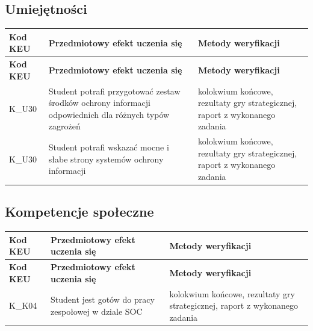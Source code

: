 \documentclass[12pt, a4paper]{article}
\newcommand{\thdrule}{\noalign{\global\setlength{\extrarowheight}{0pt}}}
\newcommand{\thdend}{\noalign{\global\setlength{\extrarowheight}{3pt}}}
\begin{document}
\subsection*{Umiejętności}
{\scriptsize
\begin{longtable}{m{1.6cm}m{9.0cm}m{4.2cm}}
\thdrule\toprule
\rowcolor{pjatkRed} {\color{white}\footnotesize\textbf{\vphantom{Ag}Kod KEU}} & {\color{white}\footnotesize\textbf{\vphantom{Ag}Przedmiotowy efekt uczenia się}} & {\color{white}\footnotesize\textbf{\vphantom{Ag}Metody weryfikacji}} \\
\midrule\thdend
\endfirsthead
\thdrule\toprule
\rowcolor{pjatkRed} {\color{white}\footnotesize\textbf{\vphantom{Ag}Kod KEU}} & {\color{white}\footnotesize\textbf{\vphantom{Ag}Przedmiotowy efekt uczenia się}} & {\color{white}\footnotesize\textbf{\vphantom{Ag}Metody weryfikacji}} \\
\midrule\thdend
\endhead
  \rowcolor{tableRowLight} K\_U30 & Student potrafi przygotować zestaw środków ochrony informacji odpowiednich dla różnych typów zagrożeń & kolokwium końcowe, rezultaty gry strategicznej, raport z wykonanego zadania \\
  \rowcolor{tableRowAlt} K\_U30 & Student potrafi wskazać mocne i słabe strony systemów ochrony informacji & kolokwium końcowe, rezultaty gry strategicznej, raport z wykonanego zadania \\
\bottomrule
\end{longtable}}

\subsection*{Kompetencje społeczne}
{\scriptsize
\begin{longtable}{m{1.6cm}m{9.0cm}m{4.2cm}}
\thdrule\toprule
\rowcolor{pjatkRed} {\color{white}\footnotesize\textbf{\vphantom{Ag}Kod KEU}} & {\color{white}\footnotesize\textbf{\vphantom{Ag}Przedmiotowy efekt uczenia się}} & {\color{white}\footnotesize\textbf{\vphantom{Ag}Metody weryfikacji}} \\
\midrule\thdend
\endfirsthead
\thdrule\toprule
\rowcolor{pjatkRed} {\color{white}\footnotesize\textbf{\vphantom{Ag}Kod KEU}} & {\color{white}\footnotesize\textbf{\vphantom{Ag}Przedmiotowy efekt uczenia się}} & {\color{white}\footnotesize\textbf{\vphantom{Ag}Metody weryfikacji}} \\
\midrule\thdend
\endhead
  \rowcolor{tableRowLight} K\_K04 & Student jest gotów do pracy zespołowej w dziale SOC & kolokwium końcowe, rezultaty gry strategicznej, raport z wykonanego zadania \\
\bottomrule
\end{longtable}}
\end{document}
